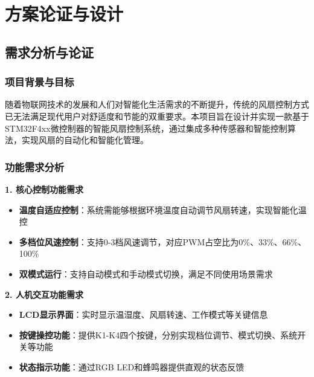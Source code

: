 \section{方案论证与设计}

\subsection{需求分析与论证}

\subsubsection{项目背景与目标}

\qquad 随着物联网技术的发展和人们对智能化生活需求的不断提升，传统的风扇控制方式已无法满足现代用户对舒适度和节能的双重要求。本项目旨在设计并实现一款基于STM32F4xx微控制器的智能风扇控制系统，通过集成多种传感器和智能控制算法，实现风扇的自动化和智能化管理。

\subsubsection{功能需求分析}

\textbf{1. 核心控制功能需求}
\begin{itemize}
    \vspace{-6pt}
  \item \textbf{温度自适应控制}：系统需能够根据环境温度自动调节风扇转速，实现智能化温控
    \vspace{-6pt}
  \item \textbf{多档位风速控制}：支持0-3档风速调节，对应PWM占空比为0\%、33\%、66\%、100\%
    \vspace{-6pt}
  \item \textbf{双模式运行}：支持自动模式和手动模式切换，满足不同使用场景需求
\end{itemize}

\textbf{2. 人机交互功能需求}

\begin{itemize}
    \vspace{-6pt}
  \item \textbf{LCD显示界面}：实时显示温湿度、风扇转速、工作模式等关键信息
    \vspace{-6pt}
  \item \textbf{按键操控功能}：提供K1-K4四个按键，分别实现档位调节、模式切换、系统开关等功能
    \vspace{-6pt}
  \item \textbf{状态指示功能}：通过RGB LED和蜂鸣器提供直观的状态反馈
\end{itemize}


